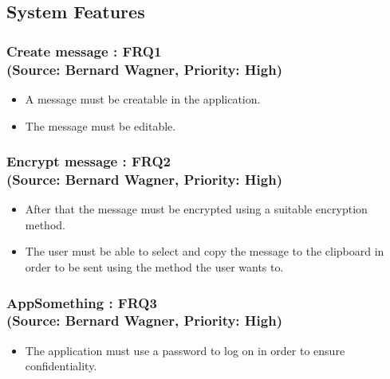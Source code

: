 \subsection{System Features}

\normalsize
\vspace{12pt}


\subsubsection{Create message : FRQ1\\(Source: Bernard Wagner, Priority: High)}%
\begin{itemize}
\item A message must be creatable in the application.
\item The message must be editable.
\end{itemize}

\subsubsection{Encrypt message : FRQ2\\(Source: Bernard Wagner, Priority: High)}
\begin{itemize}
\item After that the message must be encrypted using a suitable encryption method.
\item The user must be able to select and copy the message to the clipboard in order to be sent using the method the user wants to.
\end{itemize}




\subsubsection{AppSomething : FRQ3\\(Source: Bernard Wagner, Priority: High)}%
\begin{itemize}
\item The application must use a password to log on in order to ensure confidentiality.
\end{itemize}


